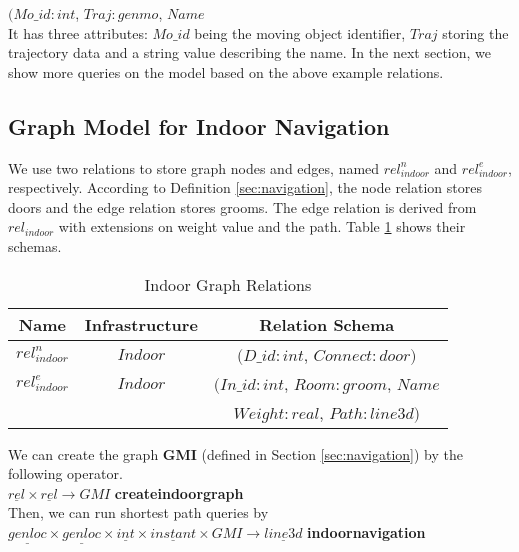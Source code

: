 $(Mo\_id:int$, $Traj:genmo$, $Name$ \\

It has three attributes: $Mo\_id$ being the moving object identifier, $Traj$ storing the 
trajectory data and a string value describing the name. In the next section, we show 
more queries on the model based on the above example relations. 

\subsection{Graph Model for Indoor Navigation}
\label{sec:relgraphmodel}
We use two relations to store graph nodes and edges, named $rel_{indoor}^n$ and $rel_{indoor}^e$, respectively. According to Definition \ref{sec:navigation},
the node relation stores doors and the edge relation stores grooms. 
The edge relation is derived from $rel_{indoor}$ with extensions on weight value and the path. 
Table \ref{tab:indoorgraphrel} shows their schemas. \\

\begin{table}[ht]
 \begin{center} 
  \begin{tabular}{c|c|c}
	\hline
	 Name&Infrastructure&Relation Schema \\
	\hline
	$rel_{indoor}^n$& $Indoor$ & $(D\_id:int$, $Connect:door)$ \\
	\hline
	$rel_{indoor}^e$& $Indoor$ & $(In\_id:int$, $Room:groom$, $Name$ \\
	& &$Weight:real$, $Path:line3d)$ \\
	\hline
  \end{tabular}
 \end{center}
 \caption{\label{tab:indoorgraphrel} Indoor Graph Relations}
\end{table}

We can create the graph \textbf{GMI} (defined in Section \ref{sec:navigation}) by the following operator. \\

$\underline{rel} \times \underline{rel} \rightarrow GMI$ \hspace{0.3cm} \textbf{createindoorgraph} \\

Then, we can run shortest path queries by \\

$\underline{genloc} \times \underline{genloc} \times \underline{int} \times \underline{instant} \times GMI\rightarrow \underline{line3d}$ \hspace{0.3cm} \textbf{indoornavigation} \\

